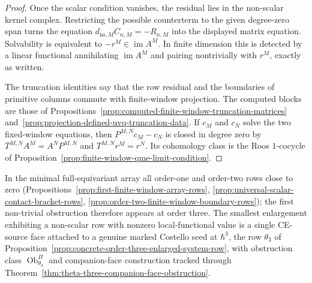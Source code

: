 \begin{proof}
  Once the scalar condition vanishes, the residual lies in the non-scalar kernel
  complex.  Restricting the possible counterterm to the given degree-zero
  span turns the equation
  \(d_{\mathrm{ns},M}C_{n,M}=-R_{n,M}\) into the displayed matrix equation.
  Solvability is equivalent to \(-r^M\in\operatorname{im}A^M\).
  In finite dimension this is detected by a linear functional annihilating
  \(\operatorname{im}A^M\) and pairing nontrivially with \(r^M\), exactly
  as written.

  The truncation identities say that the row residual and the boundaries of
  primitive columns commute with finite-window projection.  The computed
  blocks are those of
  Propositions~\ref{prop:computed-finite-window-truncation-matrices}
  and~\ref{prop:projection-defined-uvq-truncation-data}.  If \(c_M\) and \(c_N\)
  solve the two fixed-window equations, then
  \(P^{M,N}c_M-c_N\) is closed in degree zero by
  \(T^{M,N}A^M=A^N P^{M,N}\) and \(T^{M,N}r^M=r^N\).  Its cohomology class is
  the Roos \(1\)-cocycle of
  Proposition~\ref{prop:finite-window-qme-limit-condition}.
\end{proof}

In the minimal full-equivariant array all order-one and order-two
rows close to zero
(Propositions~\ref{prop:first-finite-window-array-rows},
\ref{prop:universal-scalar-contact-bracket-rows},
\ref{prop:order-two-finite-window-boundary-rows}); the first
non-trivial obstruction therefore appears at order three.  The smallest
enlargement exhibiting a non-scalar row with nonzero local-functional
value is a single CE-source face attached to a genuine marked Costello
seed at \(\hbar^3\), the row \(\theta_3\) of
Proposition~\ref{prop:concrete-order-three-enlarged-system-row}, with
obstruction class \(\operatorname{Ob}^{\Pi}_{\theta_3}\) and
companion-face construction tracked through
Theorem~\ref{thm:theta-three-companion-face-obstruction}.

